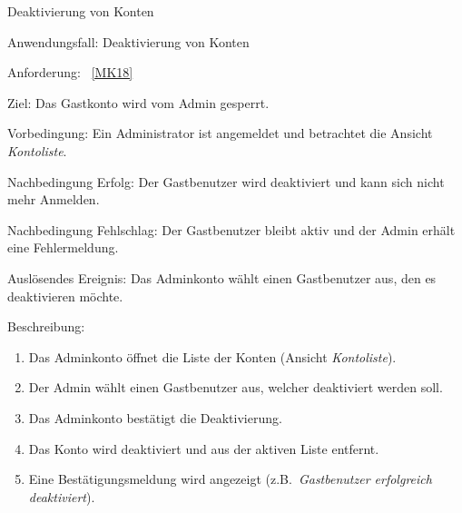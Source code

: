 \begin{function}{60}{Deaktivierung von Konten}
    \item[Anwendungsfall:] Deaktivierung von Konten
    \item[Anforderung:] ~\ref{MK18}
    \item[Ziel:] Das Gastkonto wird vom Admin gesperrt.
    \item[Vorbedingung:] Ein Administrator ist angemeldet und betrachtet die Ansicht \textit{Kontoliste}.
    \item[Nachbedingung Erfolg:] Der Gastbenutzer wird deaktiviert und kann sich nicht mehr Anmelden.
    \item[Nachbedingung Fehlschlag:] Der Gastbenutzer bleibt aktiv und der Admin erhält eine Fehlermeldung.
    \item[Auslösendes Ereignis:] Das Adminkonto wählt einen Gastbenutzer aus, den es deaktivieren möchte.
    \item[Beschreibung:] ~
    \begin{enumerate}
        \item Das Adminkonto öffnet die Liste der Konten (Ansicht \textit{Kontoliste}).
        \item Der Admin wählt einen Gastbenutzer aus, welcher deaktiviert werden soll.
        \item Das Adminkonto bestätigt die Deaktivierung.
        \item Das Konto wird deaktiviert und aus der aktiven Liste entfernt.
        \item Eine Bestätigungsmeldung wird angezeigt (z.B.\ \textit{Gastbenutzer erfolgreich deaktiviert}).
    \end{enumerate}
\end{function}

\pagebreak

